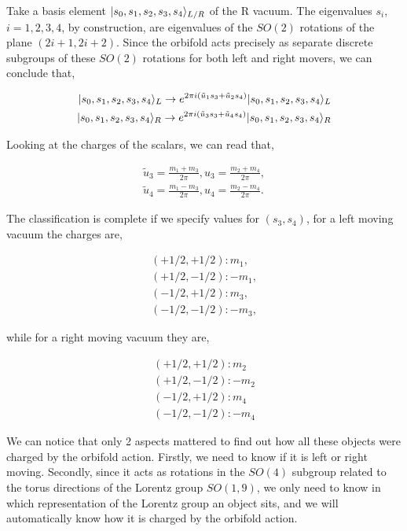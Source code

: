 Take a basis element $\lvert s_0, s_1, s_2, s_3, s_4\rangle_{L/R}$ of the R vacuum. The eigenvalues $s_i$, $i = 1,2,3,4$, by construction, are eigenvalues of the $SO(2)$ rotations of the plane $(2i+1,2i+2)$. Since the orbifold acts precisely as separate discrete subgroups of these $SO(2)$ rotations for both left and right movers, we can conclude that,

\begin{align}
    \lvert s_0,s_1,s_2,s_3,s_4\rangle_{L} \rightarrow  e^{2\pi i (\tilde{u}_1 s_3 + \tilde{u}_2 s_4)}\lvert s_0,s_1,s_2,s_3,s_4\rangle_{L}\\
    \lvert s_0,s_1,s_2,s_3,s_4\rangle_{R} \rightarrow e^{2\pi i (\tilde{u}_3 s_3 + \tilde{u}_4 s_4)} \lvert s_0,s_1,s_2,s_3,s_4\rangle_{R}
\end{align}

Looking at the charges of the scalars, we can read that,

\begin{align}
    \tilde{u}_{3}=\frac{m_{1}+m_{3}}{2\pi},u_{3}=\frac{m_{2}+m_{4}}{2\pi},\\\tilde{u}_{4}=\frac{m_{1}-m_{3}}{2\pi},u_{4}=\frac{m_{2}-m_{4}}{2\pi}.
\end{align}

The classification is complete if we specify values for $(s_3, s_4)$, for a left moving vacuum the charges are,

\begin{align}
    (+1/2, +1/2) : m_1,\\
    (+1/2, -1/2) : -m_1,\\
    (-1/2, +1/2) : m_3,\\
    (-1/2, -1/2) : -m_3,
\end{align}

while for a right moving vacuum they are,

\begin{align}
    (+1/2, +1/2) : m_2\\
    (+1/2, -1/2) : -m_2\\
    (-1/2, +1/2) : m_4\\
    (-1/2, -1/2) : -m_4
\end{align}

We can notice that only 2 aspects mattered to find out how all these objects were charged by the orbifold action. Firstly, we need to know if it is left or right moving. Secondly, since it acts as rotations in the $SO(4)$ subgroup related to the torus directions of the Lorentz group $SO(1,9)$, we only need to know in which representation of the Lorentz group an object sits, and we will automatically know how it is charged by the orbifold action.

